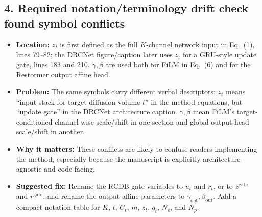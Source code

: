\documentclass[11pt]{article}
\begin{document}
\subsection*{4. Required notation/terminology drift check found symbol conflicts}
\begin{itemize}
  \item \textbf{Location:} $z_t$ is first defined as the full $K$-channel network input in Eq.~(1), lines 79--82; the DRCNet figure/caption later uses $z_t$ for a GRU-style update gate, lines 183 and 210. $\gamma,\beta$ are used both for FiLM in Eq.~(6) and for the Restormer output affine head.
  \item \textbf{Problem:} The same symbols carry different verbal descriptors: $z_t$ means ``input stack for target diffusion volume $t$'' in the method equations, but ``update gate'' in the DRCNet architecture caption. $\gamma,\beta$ mean FiLM's target-conditioned channel-wise scale/shift in one section and global output-head scale/shift in another.
  \item \textbf{Why it matters:} These conflicts are likely to confuse readers implementing the method, especially because the manuscript is explicitly architecture-agnostic and code-facing.
  \item \textbf{Suggested fix:} Rename the RCDB gate variables to $u_t$ and $r_t$, or to $z^{\mathrm{gate}}$ and $r^{\mathrm{gate}}$, and rename the output affine parameters to $\gamma_{\mathrm{out}},\beta_{\mathrm{out}}$. Add a compact notation table for $K$, $t$, $C_t$, $m$, $z_t$, $q_t$, $N_c$, and $N_p$.
\end{itemize}
\end{document}
